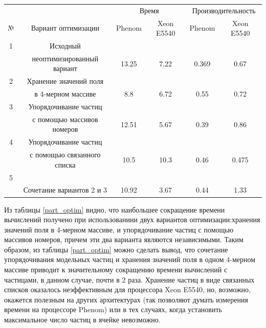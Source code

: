 	
	\begin{center}
\label{part_optim}	
\begin{tabular}{|c|c|c|c|c|c|}
\hline			

&& \multicolumn{2}{|c|}{Время} &	
   \multicolumn{2}{|c|}{Производительность}		\\		\cline{3-4} \cline{5-6}
№ &		 Вариант оптимизации                      & Phenom & Xeon  E5540  & Phenom & Xeon  E5540\\ \hline   	
1&Исходный                                          &        &            &        &            \\ 
 &неоптимизированный вариант                        & 13.25  & 7.22       &  0.369 & 0.67           \\ \hline  
2&Хранение значений поля                            &        &            &        &            \\
 & в 4-мерном массиве                               & 8.8    & 6.72       &  0.55  & 0.72       \\ \hline
3&Упорядочивание частиц                             &        &            &        &            \\ 
 & с помощью массивов номеров                       & 12.51  & 5.67       &  0.39  & 0.86           \\ \hline
4 &Упорядочивание частиц                             &        &           &        &            \\   
  & с помощью связанного списка                      & 10.5   & 10.3      &  0.46  & 0.475           \\ \hline
5 &                                                  &        &           &        &            \\
  &Сочетание вариантов 2 и 3			              & 10.92  & 3.67     &  0.44  & 1.33       \\ \hline 
		
\end{tabular}
\end{center}



Из таблицы \ref{part_optim} видно, что наибольшее сокращение времени вычислений получено при использованиии двух вариантов оптимизации:хранения значений поля в  4-мерном массиве, и упорядочивание частиц с помощью массивов номеров, причем эти два варианта являются независимыми. Таким образом, из таблицы \ref{part_optim} можно сделать вывод, что сочетание упорядочивания модельных частиц и хранения значений поля в одном 4-мерном массиве приводит к значительному сокращению времени вычислений с частицами, в данном случае, почти в 2 раза. Хранение частиц в виде связанных списков оказалось неэффективным для процессора Xeon  E5540, но, возможно, окажется полезным на других архитектурах (так позволяют думать измерения времени на процессоре Phenom) или в тех случаях, когда установить максимальное число частиц в ячейке невозможно.

